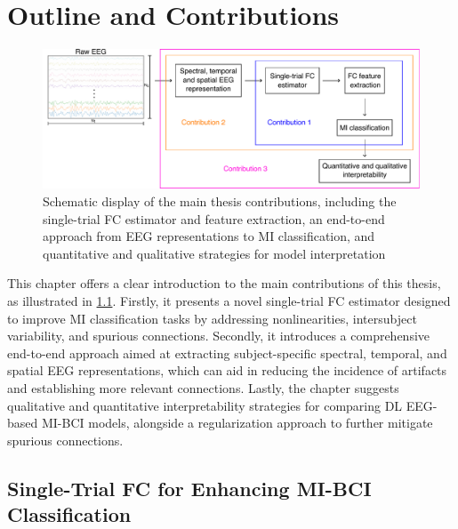 \chapter{Outline and Contributions}

\begin{figure}[h!]
    \centering
    \includegraphics[scale=0.6]{Figures/outline_and_contributions/general_contributions.pdf}
    \caption{Schematic display of the main thesis contributions, including the single-trial FC estimator and feature extraction, an end-to-end approach from EEG representations to MI classification, and quantitative and qualitative strategies for model interpretation\label{fig:img_gen_outline}}
\end{figure}

This chapter offers a clear introduction to the main contributions of this thesis, as illustrated in \cref{fig:img_gen_outline}. Firstly, it presents a novel single-trial FC estimator designed to improve MI classification tasks by addressing nonlinearities, intersubject variability, and spurious connections. Secondly, it introduces a comprehensive end-to-end approach aimed at extracting subject-specific spectral, temporal, and spatial EEG representations, which can aid in reducing the incidence of artifacts and establishing more relevant connections. Lastly, the chapter suggests qualitative and quantitative interpretability strategies for comparing DL EEG-based MI-BCI models, alongside a regularization approach to further mitigate spurious connections.


\section{Single-Trial FC for Enhancing MI-BCI Classification \label{sec:contribution1}}

